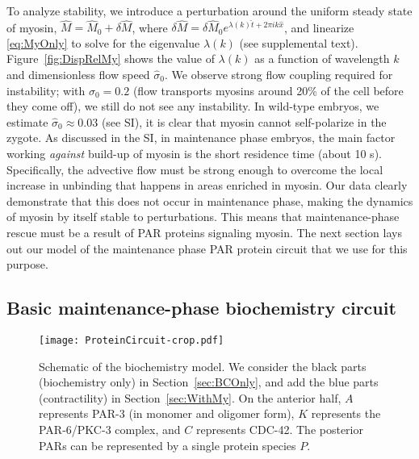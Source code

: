 \documentclass[11pt]{article}
\newcommand{\6}[1]{#1_{\text{6}}}
\newcommand{\3}[1]{#1_{\text{3}}}
\begin{document}
To analyze stability, we introduce a perturbation around the uniform steady state of myosin, $\hat M=\hat{M}_0+\delta \hat M$, where $\delta \hat M = \delta \hat M_0 e^{\lambda(k) \hat{t}+2 \pi i k \hat{x}}$, and linearize \eqref{eq:MyOnly} to solve for the eigenvalue $\lambda(k)$ (see supplemental text). Figure\ \ref{fig:DispRelMy} shows the value of $\lambda(k)$ as a function of wavelength $k$ and dimensionless flow speed $\hat \sigma_0$. We observe strong flow coupling required for instability; with $\hat{\sigma}_0=0.2$ (flow transports myosins around 20\% of the cell before they come off), we still do not see any instability. In wild-type embryos, we estimate $\hat \sigma_0 \approx 0.03$ (see SI), it is clear that myosin cannot self-polarize in the zygote. As discussed in the SI, in maintenance phase embryos, the main factor working \emph{against} build-up of myosin is the short residence time (about 10 s). Specifically, the advective flow must be strong enough to overcome the local increase in unbinding that happens in areas enriched in myosin. Our data clearly demonstrate that this does not occur in maintenance phase, making the dynamics of myosin by itself stable to perturbations. This means that maintenance-phase rescue must be a result of PAR proteins signaling myosin. The next section lays out our model of the maintenance phase PAR protein circuit that we use for this purpose. 


\subsection{Basic maintenance-phase biochemistry circuit \label{sec:BCOnly}}
\begin{figure}
\centering
\texttt{[image: ProteinCircuit-crop.pdf]}
\caption{\label{fig:ModelSch}Schematic of the biochemistry model. We consider the black parts (biochemistry only) in Section\ \ref{sec:BCOnly}, and add the blue parts (contractility) in Section\ \ref{sec:WithMy}. On the anterior half, $A$ represents PAR-3 (in monomer and oligomer form), $K$ represents the PAR-6/PKC-3 complex, and $C$ represents CDC-42. The posterior PARs can be represented by a single protein species $P$.}
\end{figure}
\end{document}
